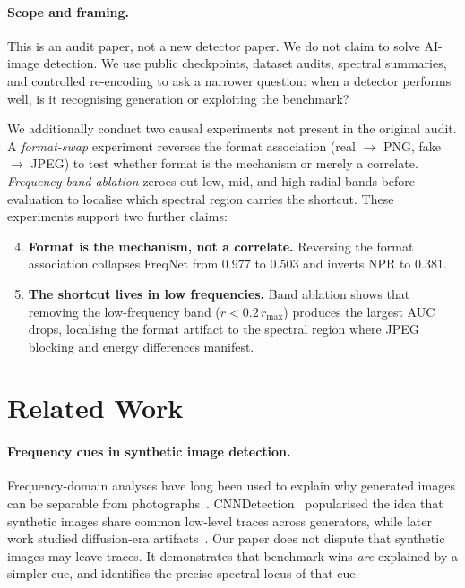 \documentclass{bmvc2k}
\begin{document}
\paragraph{Scope and framing.}
This is an audit paper, not a new detector paper. We do not claim to solve AI-image detection. We use public checkpoints, dataset audits, spectral summaries, and controlled re-encoding to ask a narrower question: when a detector performs well, is it recognising generation or exploiting the benchmark?

We additionally conduct two causal experiments not present in the original audit. A \emph{format-swap} experiment reverses the format association (real $\to$ PNG, fake $\to$ JPEG) to test whether format is the mechanism or merely a correlate. \emph{Frequency band ablation} zeroes out low, mid, and high radial bands before evaluation to localise which spectral region carries the shortcut. These experiments support two further claims:
\begin{enumerate}
  \setcounter{enumi}{3}
  \item \textbf{Format is the mechanism, not a correlate.} Reversing the format association collapses FreqNet from $0.977$ to $0.503$ and inverts NPR to $0.381$.
  \item \textbf{The shortcut lives in low frequencies.} Band ablation shows that removing the low-frequency band ($r < 0.2\,r_{\max}$) produces the largest AUC drops, localising the format artifact to the spectral region where JPEG blocking and energy differences manifest.
\end{enumerate}

\section{Related Work}
\label{sec:related}

\paragraph{Frequency cues in synthetic image detection.}
Frequency-domain analyses have long been used to explain why generated images can be separable from photographs~\cite{corvi2023intriguing,frank2020leveraging,durall2020watch}. CNNDetection~\cite{wang2020cnn} popularised the idea that synthetic images share common low-level traces across generators, while later work studied diffusion-era artifacts~\cite{ricker2024aeroblade,synthbuster2023}. Our paper does not dispute that synthetic images may leave traces. It demonstrates that benchmark wins \emph{are} explained by a simpler cue, and identifies the precise spectral locus of that cue.
\end{document}
